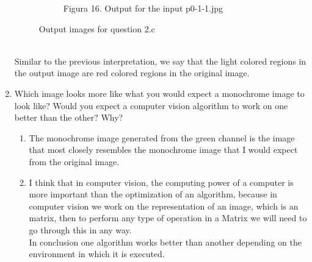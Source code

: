 \begin{enumerate}[label=\emph{\alph*)}]
\begin{figure}[h!]
\begin{subfigure}{0.5\textwidth}
  \caption{Figura 16. Output for the input p0-1-1.jpg}
  \label{fig:sfig2}
\end{subfigure}
\caption{Output images for question 2.c}
\label{fig:red-channel}
\end{figure}
\\Similar to the previous interpretation, we say that the light colored regions in the output image are red colored regions in the original image.\\
\item Which image looks more like what you would expect a monochrome image to look like? Would you
expect a computer vision algorithm to work on one better than the other? Why?
\begin{enumerate}[label=\arabic*)]
\item The monochrome image generated from the green channel is the image that most closely resembles the monochrome image that I would expect from the original image.
\item I think that in computer vision, the computing power of a computer is more important than the optimization of an algorithm, because in computer vision we work on the representation of an image, which is an matrix, then to perform any type of operation in a Matrix we will need to go through this in any way. \\In conclusion one algorithm works better than another depending on the environment in which it is executed.
\end{enumerate}
\end{enumerate}
